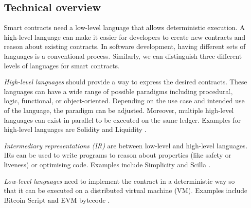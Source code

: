 

\subsection{Technical overview}
Smart contracts need a low-level language that allows deterministic execution. 
A high-level language can make it easier for developers to create new contracts and reason about existing contracts.
In software development, having different sets of languages is a conventional process.
Similarly, we can distinguish three different levels of languages for smart contracts.

\emph{High-level languages} should provide a way to express the desired contracts. These languages can have a wide range of possible paradigms including procedural, logic, functional, or object-oriented. Depending on the use case and intended use of the language, the paradigm can be adjusted. Moreover, multiple high-level languages can exist in parallel to be executed on the same ledger. Examples for high-level languages are Solidity \cite{Ethereum2018Solidity} and Liquidity \cite{OCamlProSAS2018}.

\emph{Intermediary representations (IR)} are between low-level and high-level languages. IRs can be used to write programs to reason about properties (like safety or liveness) or optimising code. Examples include Simplicity \cite{OConnor2017} and Scilla \cite{Sergey2018}.

\emph{Low-level languages} need to implement the contract in a deterministic way so that it can be executed on a distributed virtual machine (VM). Examples include Bitcoin Script \cite{BitcoinWiki2018Script} and EVM bytecode \cite{Wood2014}.

